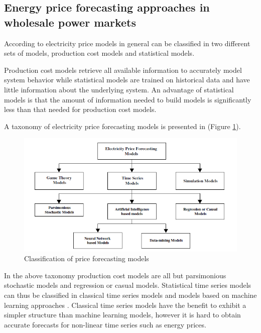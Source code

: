 \subsection{Energy price forecasting approaches in wholesale power markets}

According to \cite{lora2007electricity} electricity price models in general can be classified in two different sets of models, production cost models and statistical models. 

Production cost models retrieve all available information to accurately model system behavior while statistical models are trained on historical data and have little information about the underlying system. An advantage of statistical models is that the amount of information needed to build models is significantly less than that needed for production cost models. 

A taxonomy of electricity price forecasting models is presented in \cite{aggarwal2009electricity} (Figure \ref{fig:classification_of_price_forecasting_models}). 

\begin{figure}[htbp]
	\centering
		\includegraphics{figures/state_of_the_art/classification_of_price_forecasting_models.PNG}
	\caption{Classification of price forecasting models \cite{aggarwal2009electricity}}
	\label{fig:classification_of_price_forecasting_models}
\end{figure}

In the above taxonomy production cost models are all but parsimonious stochastic models and regression or casual models. Statistical time series models can thus be classified in classical time series models and models based on machine learning approaches \cite{lora2007electricity, duanelectricity}. Classical time series models have the benefit to exhibit a simpler structure than machine learning models, however it is hard to obtain accurate forecasts for non-linear time series such as energy prices. 

